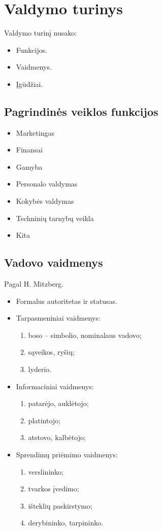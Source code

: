 \section{Valdymo turinys}

Valdymo turinį nusako:
\begin{itemize}
  \item Funkcijos.
  \item Vaidmenys.
  \item Įgūdžiai.
\end{itemize}

\subsection{Pagrindinės veiklos funkcijos}

\begin{itemize}
  \item Marketingas
  \item Finansai
  \item Gamyba
  \item Personalo valdymas
  \item Kokybės valdymas
  \item Techninių tarnybų veikla
  \item Kita
\end{itemize}

\subsection{Vadovo vaidmenys}

Pagal H. Mitzberg.

\begin{itemize}
  \item Formalus autoritetas ir statusas.
  \item Tarpasmeniniai vaidmenys:
    \begin{enumerate}
      \item boso – simbolio, nominalaus vadovo;
      \item sąveikos, ryšių;
      \item lyderio.
    \end{enumerate}
  \item Informaciniai vaidmenys:
    \begin{enumerate}
      \item patarėjo, auklėtojo;
      \item platintojo;
      \item atstovo, kalbėtojo;
    \end{enumerate}
  \item Sprendimų priėmimo vaidmenys:
    \begin{enumerate}
      \item verslininko;
      \item tvarkos įvedimo;
      \item išteklių paskirstymo;
      \item derybininko, tarpininko.
    \end{enumerate}
\end{itemize}

